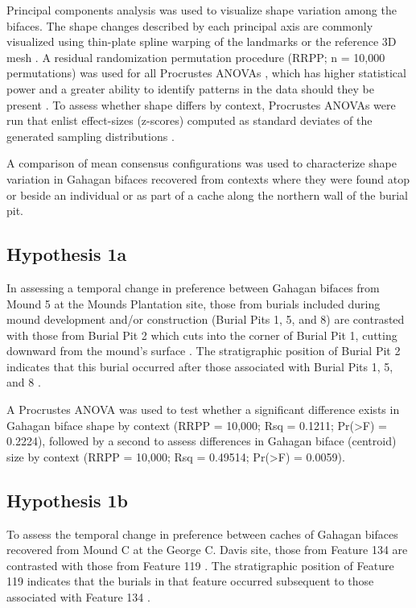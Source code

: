 \documentclass[]{interact}
\theoremstyle{plain}%
\theoremstyle{definition}
\theoremstyle{remark}
\begin{document}
Principal components analysis \citep{RN8576,RN10875} was used to
visualize shape variation among the bifaces. The shape changes described
by each principal axis are commonly visualized using thin-plate spline
warping of the landmarks or the reference 3D mesh \citep{RN8555,RN8553}.
A residual randomization permutation procedure (RRPP; n = 10,000
permutations) was used for all Procrustes ANOVAs \citep{RN8579,RN8334},
which has higher statistical power and a greater ability to identify
patterns in the data should they be present \citep{RN6995}. To assess
whether shape differs by context, Procrustes ANOVAs \citep{RN7046} were
run that enlist effect-sizes (z-scores) computed as standard deviates of
the generated sampling distributions \citep{RN8477}.

A comparison of mean consensus configurations was used to characterize
shape variation in Gahagan bifaces recovered from contexts where they
were found atop or beside an individual or as part of a cache along the
northern wall of the burial pit.

\hypertarget{hypothesis-1a}{%
\subsection{Hypothesis 1a}\label{hypothesis-1a}}

In assessing a temporal change in preference between Gahagan bifaces
from Mound 5 at the Mounds Plantation site, those from burials included
during mound development and/or construction (Burial Pits 1, 5, and 8)
are contrasted with those from Burial Pit 2 which cuts into the corner
of Burial Pit 1, cutting downward from the mound's surface
\citep{RN8174}. The stratigraphic position of Burial Pit 2 indicates
that this burial occurred after those associated with Burial Pits 1, 5,
and 8 \citep{RN8174}.

A Procrustes ANOVA was used to test whether a significant difference
exists in Gahagan biface shape by context (RRPP = 10,000; Rsq = 0.1211;
Pr(\textgreater F) = 0.2224), followed by a second to assess differences
in Gahagan biface (centroid) size by context (RRPP = 10,000; Rsq =
0.49514; Pr(\textgreater F) = 0.0059).

\hypertarget{hypothesis-1b}{%
\subsection{Hypothesis 1b}\label{hypothesis-1b}}

To assess the temporal change in preference between caches of Gahagan
bifaces recovered from Mound C at the George C. Davis site, those from
Feature 134 are contrasted with those from Feature 119
\citep{RN5746,RN8186}. The stratigraphic position of Feature 119
indicates that the burials in that feature occurred subsequent to those
associated with Feature 134 \citep{RN5746,RN8186}.
\end{document}
